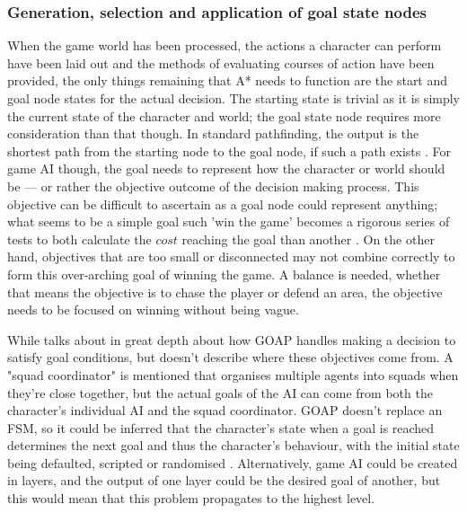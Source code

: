 \documentclass[11pt, a4paper]{article}
\begin{document}
\subsubsection{Generation, selection and application of goal state nodes}

When the game world has been processed, the actions a character can perform have been laid out and the methods of evaluating courses of action have been provided, the only things remaining that A* needs to function are the start and goal node states for the actual decision. The starting state is trivial as it is simply the current state of the character and world; the goal state node requires more consideration than that though. In standard pathfinding, the output is the shortest path from the starting node to the goal node, if such a path exists \parencite[61]{nareyek2004ai}. For game AI though, the goal needs to represent how the character or world should be --- or rather the objective outcome of the decision making process. This objective can be difficult to ascertain as a goal node could represent anything; what seems to be a simple goal such 'win the game' becomes a rigorous series of tests to both calculate the $cost$ reaching the goal than another \parencite[403]{harmon2002economic}. On the other hand, objectives that are too small or disconnected may not combine correctly to form this over-arching goal of winning the game. A balance is needed, whether that means the objective is to chase the player or defend an area, the objective needs to be focused on winning without being vague.

While \citeauthor{orkin2003applying} \parencite*{orkin2003applying} talks about in great depth about how GOAP handles making a decision to satisfy goal conditions, but doesn't describe where these objectives come from. A "squad coordinator" is mentioned \parencite[13]{orkin2003applying} that organises multiple agents into squads when they're close together, but the actual goals of the AI can come from both the character's individual AI and the squad coordinator. GOAP doesn't replace an FSM, so it could be inferred that the character's state when a goal is reached determines the next goal and thus the character's behaviour, with the initial state being defaulted, scripted or randomised \parencite[2]{orkin2003applying}. Alternatively, game AI could be created in layers, and the output of one layer could be the desired goal of another, but this would mean that this problem propagates to the highest level. 
\end{document}
